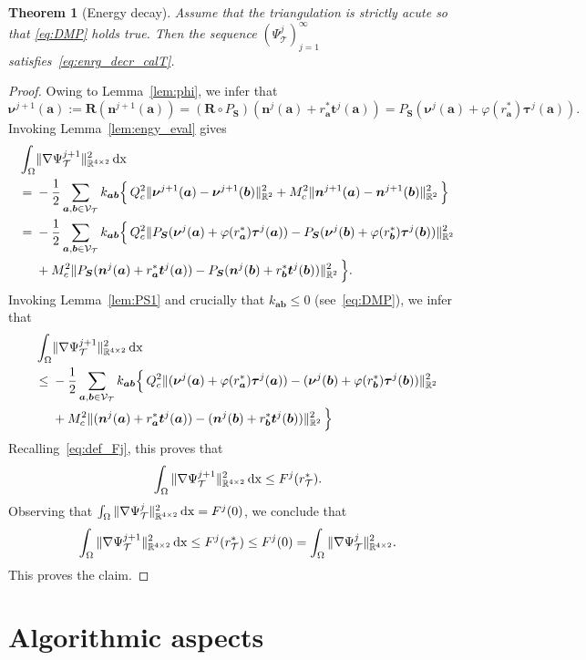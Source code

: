 \documentclass[a4paper,11pt]{article}
\newtheorem{theorem}{Theorem}[section]
\theoremstyle{definition}
\theoremstyle{remark}
\numberwithin{equation}{section}
\newcommand{\dx}{\,{\rm dx}}
\newcommand{\disr}{r_\calT}
\newcommand{\Real}{\mathbb{R}}
\newcommand{\ba}{{\boldsymbol a}}
\newcommand{\bb}{{\boldsymbol b}}
\newcommand{\bn}{{\boldsymbol n}}
\newcommand{\bt}{{\boldsymbol t}}
\newcommand{\bR}{{\boldsymbol R}}
\newcommand{\bS}{{\boldsymbol S}}
\newcommand{\bnu}{{\boldsymbol \nu}}
\newcommand{\btau}{{\boldsymbol \tau}}
\newcommand{\calT}{\mathcal{T}}
\newcommand{\calV}{\mathcal{V}}
\newcommand{\vertex}{\calV_\calT}
\begin{document}
\begin{theorem}[Energy decay] \label{thm:engy-decr-disc}
Assume that the triangulation is strictly acute so that \eqref{eq:DMP} holds true.
Then the sequence $(\Psi_\calT^j)_{j=1}^\infty$ satisfies~\eqref{eq:enrg_decr_calT}. 
\end{theorem}

\begin{proof}
Owing to Lemma~\ref{lem:phi}, we infer that
\[
\bnu^{j+1}(\ba):= \bR(\bn^{j+1}(\ba)) = (\bR \circ P_{\bS})(\bn^j(\ba)+r^*_{\ba}\bt^j(\ba))
=P_{\bS}(\bnu^j(\ba)+\varphi(r^*_{\ba})\btau^j(\ba)).
\]
Invoking Lemma~\ref{lem:engy_eval} gives
\begin{align*}
\int_\Omega &\|\nabla \Psi_\calT^{j+1}\|_{\Real^{4\times2}}^2 \dx \\= {}& - \frac12
\sum_{\ba,\bb\in\vertex} k_{\ba\bb}\Big\{ \, Q_c^2\|\bnu^{j+1}(\ba)-\bnu^{j+1}(\bb)\|_{\Real^2}^2
+ M_c^2\|\bn^{j+1}(\ba)-\bn^{j+1}(\bb)\|_{\Real^2}^2 \, \Big\} \\
={}&  - \frac12
\sum_{\ba,\bb\in\vertex} k_{\ba\bb}\Big\{ \, Q_c^2\|P_{\bS}(\bnu^j(\ba)+\varphi(r^*_{\ba})\btau^j(\ba)) - P_{\bS}(\bnu^j(\bb)+\varphi(r^*_{\bb})\btau^j(\bb))\|_{\Real^2}^2 \\
&+ M_c^2 \|P_{\bS}(\bn^j(\ba)+r^*_{\ba}\bt^j(\ba))-P_{\bS}(\bn^j(\bb)+r^*_{\bb}\bt^j(\bb))\|_{\Real^2}^2 \, \Big\}.
\end{align*}
Invoking Lemma~\ref{lem:PS1} and crucially that $k_{\ba\bb}\le 0$ (see~\eqref{eq:DMP}),
we infer that
\begin{align*}
\int_\Omega &\|\nabla \Psi_\calT^{j+1}\|_{\Real^{4\times2}}^2 \dx \\
\le{}&  - \frac12
\sum_{\ba,\bb\in\vertex} k_{\ba\bb}\Big\{ \, Q_c^2\|(\bnu^j(\ba)+\varphi(r^*_{\ba})\btau^j(\ba)) - (\bnu^j(\bb)+\varphi(r^*_{\bb})\btau^j(\bb))\|_{\Real^2}^2 \\
&+ M_c^2 \|(\bn^j(\ba)+r^*_{\ba}\bt^j(\ba))-(\bn^j(\bb)+r^*_{\bb}\bt^j(\bb))\|_{\Real^2}^2 \, \Big\}
\end{align*}
Recalling~\eqref{eq:def_Fj}, this proves that
\[
\int_\Omega \|\nabla \Psi_\calT^{j+1}\|_{\Real^{4\times2}}^2 \dx \le F^j(\disr^*).
\]
Observing that $\int_\Omega \|\nabla \Psi_\calT^{j}\|_{\Real^{4\times2}}^2 \dx = F^j(0)$,
we conclude that
\[
\int_\Omega \|\nabla \Psi_\calT^{j+1}\|_{\Real^{4\times2}}^2 \dx \le F^j(\disr^*)
\le F^j(0) = \int_\Omega \|\nabla \Psi_\calT^{j}\|_{\Real^{4\times2}}^2.
\]
This proves the claim.
\end{proof}

\section{Algorithmic aspects}
\label{sec:algo}
\end{document}
